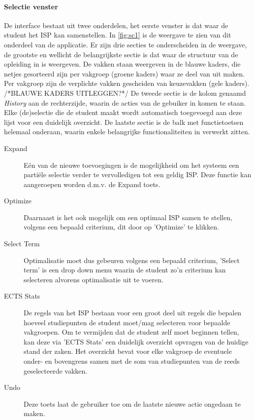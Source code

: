 \paragraph{Selectie venster}
De interface bestaat uit twee onderdelen, het eerste venster is dat waar de student het ISP kan samenstellen. In \ref{fig:sc1} is de weergave te zien van dit onderdeel van de applicatie. Er zijn drie secties te onderscheiden in de weergave, de grootste en wellicht de belangrijkste sectie is dat waar de structuur van de opleiding in is weergeven. De vakken staan weergeven in de blauwe kaders, die netjes gesorteerd zijn per vakgroep (groene kaders) waar ze deel van uit maken. Per vakgroep zijn de verplichte vakken gescheiden van keuzevakken (gele kaders). /*BLAUWE KADERS UITLEGGEN?*/ De tweede sectie is de kolom genaamd \textit{History} aan de rechterzijde, waarin de acties van de gebuiker in komen te staan. Elke (de)selectie die de student maakt wordt automatisch toegevoegd aan deze lijst voor een duidelijk overzicht. De laatste sectie is de balk met functietoetsen helemaal onderaan, waarin enkele belangrijke functionaliteiten in verwerkt zitten. 
\begin{description}
\item [Expand] E\'{e}n van de nieuwe toevoegingen is de mogelijkheid om het systeem een parti\"{e}le selectie verder te vervolledigen tot een geldig ISP. Deze functie kan aangeroepen worden d.m.v. de Expand toets.
\item[Optimize] Daarnaast is het ook mogelijk om een optimaal ISP samen te stellen, volgens een bepaald criterium, dit door op 'Optimize' te klikken.
\item[Select Term] Optimalisatie moet dus gebeuren volgens een bepaald criterium, 'Select term' is een drop down menu waarin de student zo'n criterium kan selecteren alvorens optimalisatie uit te voeren.
\item[ECTS Stats] De regels van het ISP bestaan voor een groot deel uit regels die bepalen hoeveel studiepunten de student moet/mag selecteren voor bepaalde vakgroepen. Om te vermijden dat de student zelf moet beginnen tellen, kan deze via 'ECTS Stats' een duidelijk overzicht opvragen van de huidige stand der zaken. Het overzicht bevat voor elke vakgroep de eventuele onder- en bovengrens samen met de som van studiepunten van de reeds geselecteerde vakken.
\item[Undo] Deze toets laat de gebruiker toe om de laatste nieuwe actie ongedaan te maken. 
\end{description}

